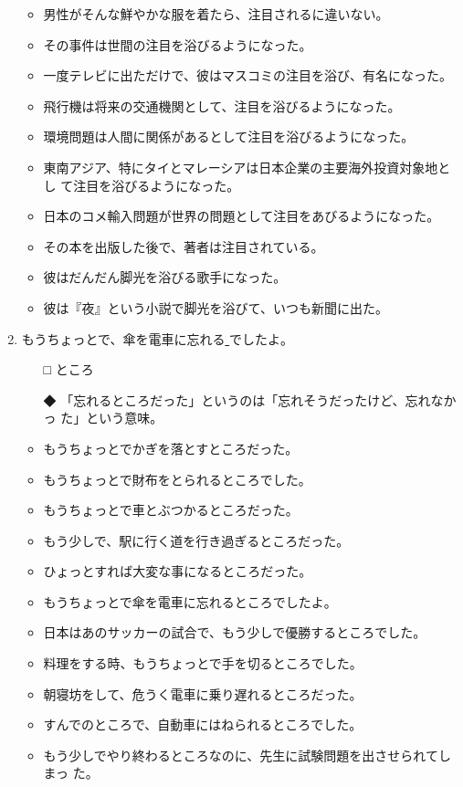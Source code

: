 \documentclass[
uplatex,
b5paper,
10pt,
dvipdfmx
]{jsbook}
\begin{document}
\begin{enumerate}
\begin{itemize}
\item 男性がそんな鮮やかな服を着たら、注目されるに違いない。
\item その事件は世間の注目を浴びるようになった。
\item 一度テレビに出ただけで、彼はマスコミの注目を浴び、有名になった。
\item 飛行機は将来の交通機関として、注目を浴びるようになった。
\item 環境問題は人間に関係があるとして注目を浴びるようになった。
\item 東南アジア、特にタイとマレーシアは日本企業の主要海外投資対象地とし
      て注目を浴びるようになった。
\item 日本のコメ輸入問題が世界の問題として注目をあびるようになった。
\item その本を出版した後で、著者は注目されている。
\item 彼はだんだん脚光を浴びる歌手になった。
\item 彼は『夜』という小説で脚光を浴びて、いつも新聞に出た。
\end{itemize}

\item もうちょ{}っとで、傘を電車に忘れる\underline{    }でしたよ。

\begin{itemize}
\item[□] ところ
\item[◆] 「忘れるところだった」というのは「忘れそうだったけど、忘れなかっ
	  た」という意味。
\end{itemize}

\begin{itemize}
\item もうちょ{}っとでかぎを落とすところだった。
\item もうちょ{}っとで財布をとられるところでした。
\item もうちょ{}っとで車とぶつかるところだった。
\item もう少しで、駅に行く道を行き過ぎるところだった。
\item ひょ{}っとすれば大変な事になるところだった。
\item もうちょ{}っとで傘を電車に忘れるところでしたよ。
\item 日本はあのサッカーの試合で、もう少しで優勝するところでした。
\item 料理をする時、もうちょ{}っとで手を切るところでした。
\item 朝寝坊をして、危うく電車に乗り遅れるところだった。
\item すんでのところで、自動車にはねられるところでした。
\item もう少しでやり終わるところなのに、先生に試験問題を出させられてしまっ
      た。
\end{itemize}

\end{enumerate}
\end{document}
